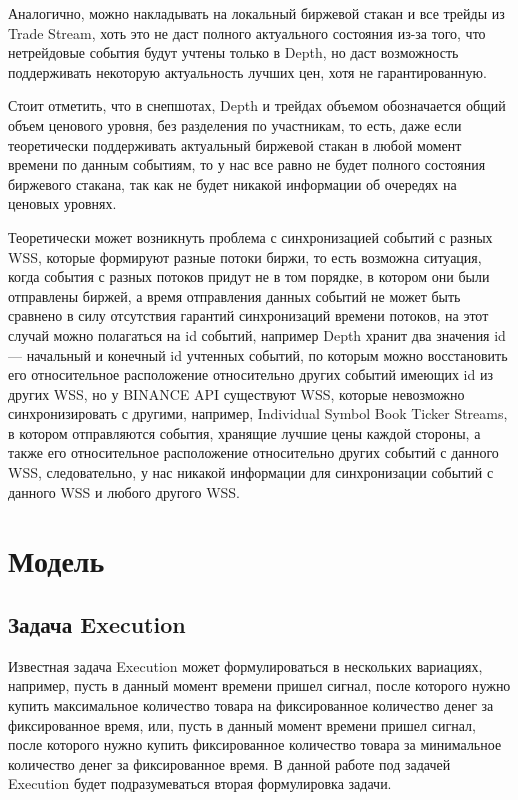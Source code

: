 \documentclass[12pt, a4paper]{article}
\begin{document}
Аналогично, можно накладывать на локальный биржевой стакан и все трейды из Trade Stream, хоть это не даст полного актуального состояния из-за того, что нетрейдовые события будут учтены только в Depth, но даст возможность поддерживать некоторую актуальность лучших цен, хотя не гарантированную. 

Стоит отметить, что в снепшотах, Depth и трейдах объемом обозначается общий объем ценового уровня, без разделения по участникам, то есть, даже если теоретически поддерживать актуальный биржевой стакан в любой момент времени по данным событиям, то у нас все равно не будет полного состояния биржевого стакана, так как не будет никакой информации об очередях на ценовых уровнях.

Теоретически может возникнуть проблема с синхронизацией событий с разных WSS, которые формируют разные потоки биржи, то есть возможна ситуация, когда события с разных потоков придут не в том порядке, в котором они были отправлены биржей, а время отправления данных событий не может быть сравнено в силу отсутствия гарантий синхронизаций времени потоков, на этот случай можно полагаться на id событий, например Depth хранит два значения id --- начальный и конечный id учтенных событий, по которым можно восстановить его относительное расположение относительно других событий имеющих id из других WSS, но у BINANCE API существуют WSS, которые невозможно синхронизировать с другими, например, Individual Symbol Book Ticker Streams, в котором отправляются события, хранящие лучшие цены каждой стороны, а также его относительное расположение относительно других событий с данного WSS, следовательно, у нас никакой информации для синхронизации событий с данного WSS и любого другого WSS.

\section{Модель}

\hypertarget{exec}{
\subsection{Задача Execution}}

Известная задача Execution может формулироваться в нескольких вариациях, например, пусть в данный момент времени пришел сигнал, после которого нужно купить максимальное количество товара на фиксированное количество денег за фиксированное время, или, пусть в данный момент времени пришел сигнал, после которого нужно купить фиксированное количество товара за минимальное количество денег за фиксированное время. В данной работе под задачей Execution будет подразумеваться вторая формулировка задачи.
\end{document}
